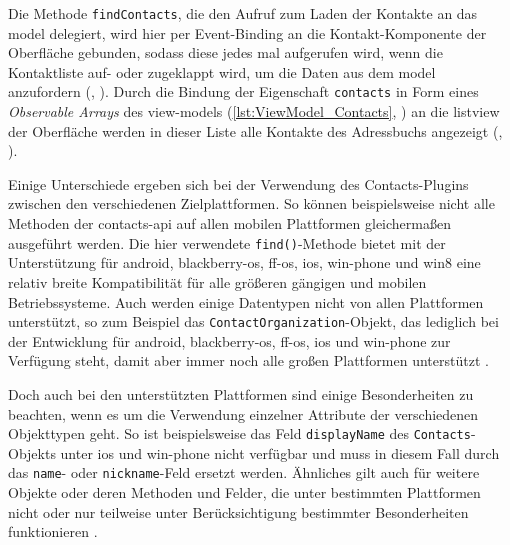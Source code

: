 
Die Methode \lstinline|findContacts|, die den Aufruf zum Laden der Kontakte an das \gls{model} delegiert, wird hier per Event-Binding an die Kontakt-Komponente der Oberfläche gebunden, sodass diese jedes mal aufgerufen wird, wenn die Kontaktliste auf- oder zugeklappt wird, um die Daten aus dem \gls{model} anzufordern (, ).
Durch die Bindung der Eigenschaft \lstinline|contacts| in Form eines \emph{Observable Arrays} des \glspl{view-model} (\autoref{lst:ViewModel_Contacts}, ) an die \gls{listview} der Oberfläche werden in dieser Liste alle Kontakte des Adressbuchs angezeigt (, ).

		
Einige Unterschiede ergeben sich bei der Verwendung des Contacts-Plugins zwischen den verschiedenen Zielplattformen.
So können beispielsweise nicht alle Methoden der contacts-\gls{api} auf allen mobilen Plattformen gleichermaßen ausgeführt werden.
Die hier verwendete \lstinline|find()|-Methode bietet mit der Unterstützung für \gls{android}, \gls{blackberry-os}, \gls{ff-os}, \gls{ios}, \gls{win-phone} und \gls{win8} eine relativ  breite Kompatibilität für alle größeren gängigen und mobilen Betriebssysteme.
Auch werden einige Datentypen nicht von allen Plattformen unterstützt, so zum Beispiel das \lstinline|ContactOrganization|-Objekt, das lediglich bei der Entwicklung für \gls{android}, \gls{blackberry-os}, \gls{ff-os}, \gls{ios} und \gls{win-phone} zur Verfügung steht, damit aber immer noch alle großen Plattformen unterstützt \cite{Cordova_Plugin_Registry_Contacts}.

Doch auch bei den unterstützten Plattformen sind einige Besonderheiten zu beachten, wenn es um die Verwendung einzelner Attribute der verschiedenen Objekttypen geht.
So ist beispielsweise das Feld \lstinline|displayName| des \lstinline|Contacts|-Objekts unter \gls{ios} und \gls{win-phone} nicht verfügbar und muss in diesem Fall durch das \lstinline|name|- oder \lstinline|nickname|-Feld ersetzt werden. %
Ähnliches gilt auch für weitere Objekte oder deren Methoden und Felder, die unter bestimmten Plattformen nicht oder nur teilweise unter Berücksichtigung bestimmter Besonderheiten funktionieren \cite{Cordova_Plugin_Registry_Contacts}.

